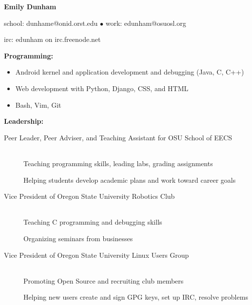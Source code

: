 \documentclass[11pt]{article}
\begin{document}
\centerline{{\LARGE \bf Emily Dunham}}

\smallskip

\centerline{{school: dunhame@onid.orst.edu $\bullet$ work:
edunham@osuosl.org}}
\centerline{{irc: edunham on irc.freenode.net}}

\hrulefill

\bigskip


\smallskip

{\large \bf Programming:}

    \begin{itemize}
        \item Android kernel and application development and debugging (Java, C, C++)
        \item Web development with Python, Django, CSS, and HTML
        \item Bash, Vim, Git
    \end{itemize}

{\large \bf Leadership:}

\begin{description}

    \item[Peer Leader, Peer Adviser, and Teaching Assistant for OSU School of EECS]

        \hfill \\ 
        Teaching programming skills, leading labs, grading assignments
        
        Helping students develop academic plans and work toward career goals

    \item[Vice President of Oregon State University Robotics Club]

        \hfill \\
        Teaching C programming and debugging skills

        Organizing seminars from businesses

    \item[Vice President of Oregon State University Linux Users Group]

        \hfill \\
        Promoting Open Source and recruiting club members

        Helping new users create and sign GPG keys, set up IRC, resolve problems
\end{description}

\end{document}
